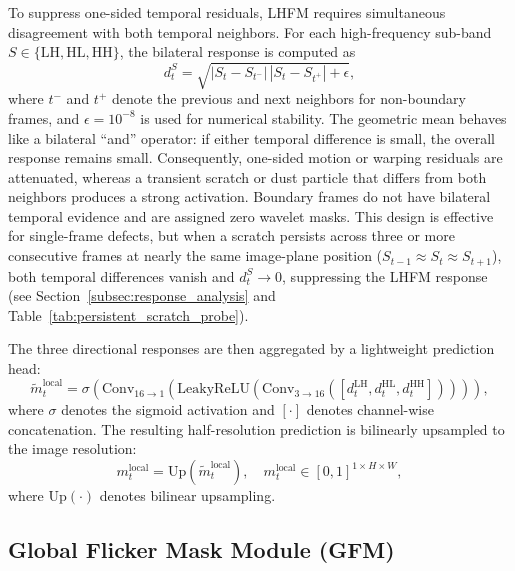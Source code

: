 {To suppress one-sided temporal residuals, LHFM requires simultaneous disagreement with both temporal neighbors. For each high-frequency sub-band $S\in\{\mathrm{LH},\mathrm{HL},\mathrm{HH}\}$, the bilateral response is computed as
\begin{equation}\label{eq:geomean}
    d_t^{S}=\sqrt{|S_t-S_{t^-}|\,|S_t-S_{t^+}|+\epsilon},
\end{equation}
where $t^-$ and $t^+$ denote the previous and next neighbors for non-boundary frames, and $\epsilon=10^{-8}$ is used for numerical stability. The geometric mean behaves like a bilateral ``and'' operator: if either temporal difference is small, the overall response remains small. Consequently, one-sided motion or warping residuals are attenuated, whereas a transient scratch or dust particle that differs from both neighbors produces a strong activation. Boundary frames do not have bilateral temporal evidence and are assigned zero wavelet masks. This design is effective for single-frame defects, but when a scratch persists across three or more consecutive frames at nearly the same image-plane position ($S_{t-1}\approx S_t\approx S_{t+1}$), both temporal differences vanish and $d_t^S\to 0$, suppressing the LHFM response (see Section~\ref{subsec:response_analysis} and Table~\ref{tab:persistent_scratch_probe}).

The three directional responses are then aggregated by a lightweight prediction head:
\begin{equation}\label{eq:local_mask}
    \tilde{m}_t^{\mathrm{local}}=\sigma\!\left(\mathrm{Conv}_{16\to1}\!\left(\mathrm{LeakyReLU}\!\left(\mathrm{Conv}_{3\to16}\!\left([d_t^{\mathrm{LH}},d_t^{\mathrm{HL}},d_t^{\mathrm{HH}}]\right)\right)\right)\right),
\end{equation}
where $\sigma$ denotes the sigmoid activation and $[\cdot]$ denotes channel-wise concatenation. The resulting half-resolution prediction is bilinearly upsampled to the image resolution:
\begin{equation}\label{eq:local_mask_up}
    m_t^{\mathrm{local}}=\mathrm{Up}(\tilde{m}_t^{\mathrm{local}}), \quad m_t^{\mathrm{local}}\in[0,1]^{1\times H\times W},
\end{equation}
where $\mathrm{Up}(\cdot)$ denotes bilinear upsampling.

\subsection{Global Flicker Mask Module (GFM)}\label{subsec:flicker}

}
